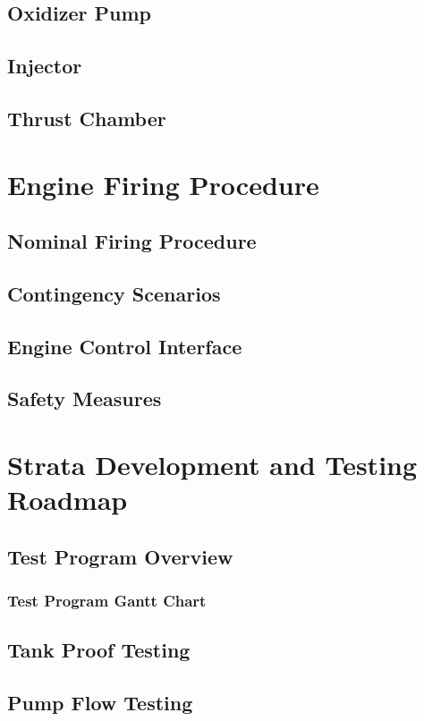 \documentclass[12pt, letterpaper]{article}
\begin{document}
\subsection{Oxidizer Pump}
\subsection{Injector}
\subsection{Thrust Chamber}

\section{Engine Firing Procedure}
\subsection{Nominal Firing Procedure}
\subsection{Contingency Scenarios}
\subsection{Engine Control Interface}
\subsection{Safety Measures}

\newpage

\section{Strata Development and Testing Roadmap}
\subsection{Test Program Overview}
\subsubsection{Test Program Gantt Chart}
\subsection{Tank Proof Testing}
\subsection{Pump Flow Testing}
\end{document}
